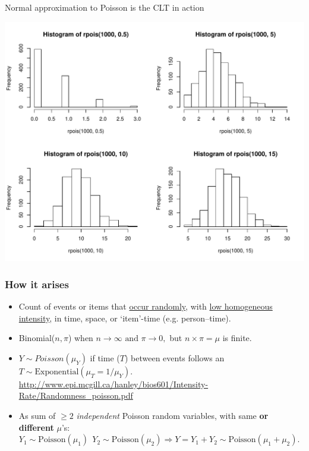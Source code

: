 \documentclass[handout]{beamer}\usepackage[]{graphicx}\usepackage[]{color}
\newenvironment{knitrout}{}{} %
\begin{document}
\begin{frame}[fragile]{Normal approximation to Poisson is the CLT in action}
\begin{knitrout}\scriptsize
{}\color{fgcolor}

{\centering \includegraphics[width=1\linewidth]{figure/unnamed-chunk-7-1} 

}



\end{knitrout}
\end{frame}	



\begin{frame}
\frametitle{How it arises}

\begin{itemize}
\setlength\itemsep{1em}
\item  Count of events or items that \underline{occur randomly}, with \underline{low homogeneous intensity}, in time, space, or `item'-time (e.g. person--time). \pause 
\item Binomial($n,\pi$) when $n \rightarrow \infty\textrm{ and } \pi \rightarrow 0,$ but $n \times \pi = \mu$ is finite.\pause 
\item $Y\sim Poisson(\mu_Y)$ if time ($T$) between events follows an $T \sim \textrm{Exponential}(\mu_{T} = 1/\mu_{Y}).$ 
{ \scriptsize   \url{http://www.epi.mcgill.ca/hanley/bios601/Intensity-Rate/Randomness_poisson.pdf}} \pause
\item  As sum of $\ge 2$  \textit{independent} Poisson random variables, 
with same \textbf{or different} $\mu$'s: \newline 
$Y_{1} \sim \textrm{Poisson}(\mu_{1}) \: \:   
Y_{2} \sim \textrm{Poisson}(\mu_{2}) \Rightarrow Y = Y_{1} + Y_{2} \sim \textrm{Poisson}(\mu_{1}+\mu_{2}).$
\end{itemize}
\end{frame}
\end{document}
